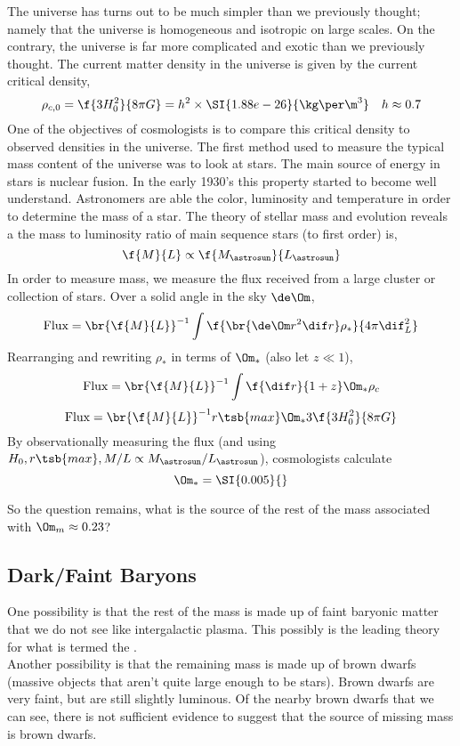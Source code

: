 \documentclass{article}
\begin{document}
The universe has turns out to be much simpler than we previously thought; namely that the universe is homogeneous and isotropic on large scales. On the contrary, the universe is far more complicated and exotic than we previously thought. The current matter density in the universe is given by the current critical density,
\[ \rho_{c,0} = \f{3 H_0^2}{8 \pi G} = h^2\times\SI{1.88e-26}{\kg \per \m^3} \quad h \approx 0.7 \]
One of the objectives of cosmologists is to compare this critical density to observed densities in the universe. The first method used to measure the typical mass content of the universe was to look at stars. The main source of energy in stars is nuclear fusion. In the early 1930's this property started to become well understand. Astronomers are able the color, luminosity and temperature in order to determine the mass of a star. The theory of stellar mass and evolution reveals a the mass to luminosity ratio of main sequence stars (to first order) is,
\[ \f{M}{L} \propto \f{M_{\astrosun}}{L_{\astrosun}} \]
In order to measure mass, we measure the flux received from a large cluster or collection of stars. Over a solid angle in the sky $\de \Om$,
\[ \text{Flux} = \br{\f{M}{L}}^{-1} \int \f{\br{\de \Om r^2 \dif r} \rho_{*}}{4 \pi \dif^2_L} \]
Rearranging and rewriting $\rho_{*}$ in terms of $\Om_{*}$ (also let $z \ll 1$),
\[ \text{Flux} = \br{\f{M}{L}}^{-1} \int \f{ \dif r}{1 + z} \Om_{*} \rho_c \]
\[ \text{Flux} = \br{\f{M}{L}}^{-1} r\tsb{max} \Om_{*} 3 \f{3H_0^2}{8 \pi G} \]
By observationally measuring the flux (and using $H_0, r\tsb{max}, M/L \propto M_{\astrosun} / L_{\astrosun}$), cosmologists calculate
\[ \Om_{*} = \SI{0.005}{} \]

So the question remains, what is the source of the rest of the mass associated with $\Om_{m} \approx 0.23$?
\subsection{Dark/Faint Baryons}
One possibility is that the rest of the mass is made up of faint baryonic matter that we do not see like intergalactic plasma. This possibly is the leading theory for what is termed the . \\

Another possibility is that the remaining mass is made up of brown dwarfs (massive objects that aren't quite large enough to be stars). Brown dwarfs are very faint, but are still slightly luminous. Of the nearby brown dwarfs that we can see, there is not sufficient evidence to suggest that the source of missing mass is brown dwarfs.\\
\end{document}
